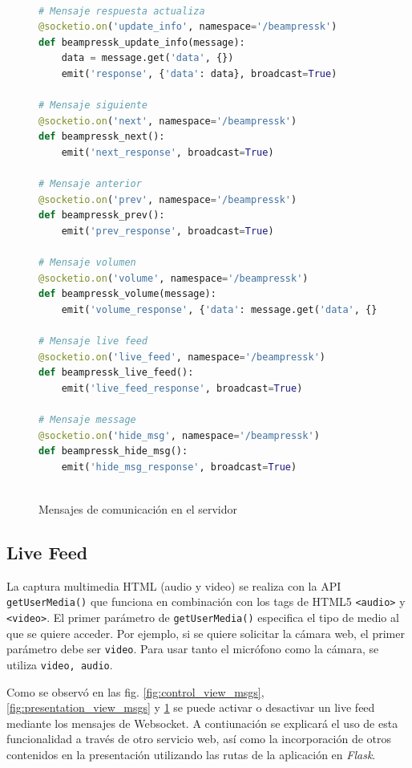 			\begin{figure}[htb]%
				\begin{lstlisting}[language=Python]%

# Mensaje respuesta actualiza
@socketio.on('update_info', namespace='/beampressk')
def beampressk_update_info(message):
    data = message.get('data', {})
    emit('response', {'data': data}, broadcast=True)

# Mensaje siguiente
@socketio.on('next', namespace='/beampressk')
def beampressk_next():
    emit('next_response', broadcast=True)

# Mensaje anterior
@socketio.on('prev', namespace='/beampressk')
def beampressk_prev():
    emit('prev_response', broadcast=True)

# Mensaje volumen
@socketio.on('volume', namespace='/beampressk')
def beampressk_volume(message):
    emit('volume_response', {'data': message.get('data', {})}, broadcast=True)

# Mensaje live feed
@socketio.on('live_feed', namespace='/beampressk')
def beampressk_live_feed():
    emit('live_feed_response', broadcast=True)

# Mensaje message
@socketio.on('hide_msg', namespace='/beampressk')
def beampressk_hide_msg():
    emit('hide_msg_response', broadcast=True)
  
				\end{lstlisting}
			\caption{Mensajes de comunicación en el servidor}
			\label{fig:server_msgs}
			\end{figure}							


		\subsection{Live Feed} %
		\label{sub:live_feed}

			La captura multimedia HTML (audio y video) se realiza con la API \texttt{getUserMedia()} que funciona en combinación con los tags de HTML5 \texttt{<audio>} y \texttt{<video>}. El primer parámetro de \texttt{getUserMedia()} especifica el tipo de medio al que se quiere acceder. Por ejemplo, si se quiere solicitar la cámara web, el primer parámetro debe ser \texttt{video}. Para usar tanto el micrófono como la cámara, se utiliza \texttt{video, audio}.

			Como se observó en las fig. \ref{fig:control_view_msgs}, \ref{fig:presentation_view_msgs} y \ref{fig:server_msgs} se puede activar o desactivar un live feed mediante los mensajes de Websocket. A contiunación se explicará el uso de esta funcionalidad a través de otro servicio web, así como la incorporación de otros contenidos en la presentación utilizando las rutas de la aplicación en \textit{Flask}.
		

